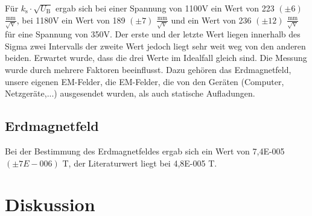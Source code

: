 \documentclass[12pt]{scrartcl}
\begin{document}
Für $k_\text{s} \cdot \sqrt{U_\text{B}}$ ergab sich bei einer Spannung von 1100V ein Wert von 223 $(\pm 6)$ $\frac{\text{mm}}{\sqrt{\text{V}}}$, bei 1180V ein Wert von 189 $(\pm 7)$ $\frac{\text{mm}}{\sqrt{\text{V}}}$ und ein Wert von 236 $(\pm 12)$ $\frac{\text{mm}}{\sqrt{\text{V}}}$ für eine Spannung von 350V. Der erste und der letzte Wert liegen innerhalb des Sigma zwei Intervalls der zweite Wert jedoch liegt sehr weit weg von den anderen beiden. Erwartet wurde, dass die drei Werte im Idealfall gleich sind.
Die Messung wurde durch mehrere Faktoren beeinflusst. Dazu gehören das Erdmagnetfeld, unsere eigenen EM-Felder, die EM-Felder, die von den Geräten (Computer, Netzgeräte,...) ausgesendet wurden, als auch statische Aufladungen.

\subsection{Erdmagnetfeld}
Bei der Bestimmung des Erdmagnetfeldes ergab sich ein Wert von 7,4E-005 $(\pm 7E-006)$ T, der Literaturwert liegt bei 4,8E-005 T.

\newpage
\section{Diskussion}
\end{document}
